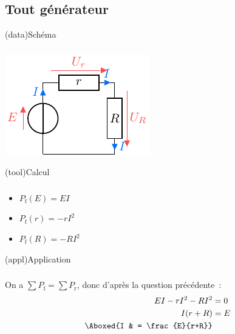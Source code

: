 \documentclass[../../main/main.tex]{subfiles}
\begin{document}
{\subsection{Tout générateur}
\begin{tcbraster}[raster columns=7, raster equal height=rows]
    \begin{tcb}[raster multicolumn=2](data){Schéma}
        \subsubsection{}
        \vfill
        \begin{center}
            \includegraphics{convs_b}
        \end{center}
        \vfill
    \end{tcb}
    \begin{tcb}[raster multicolumn=2](tool){Calcul}
        \subsubsection{}
        \vfill
        \begin{itemize}[leftmargin=20pt]
            \item $P_{\text{f}}(E) = EI$
            \item $P_{\text{f}}(r) = -rI^2$
            \item $P_{\text{f}}(R) = -RI^2$
        \end{itemize}
        \vfill
    \end{tcb}
    \begin{tcb}[raster multicolumn=3](appl){Application}
        \subsubsection{}
        On a $\sum P_{\text{f}} = \sum P_{\text{r}}$, donc d'après
        la question précédente~:
        \begin{align*}
            EI - rI^2 - RI^2 & = 0\\
            I(r+R)           & = E\\
            \Aboxed{I        & = \frac{E}{r+R}}
        \end{align*}
    \end{tcb}
\end{tcbraster}

}
\end{document}
